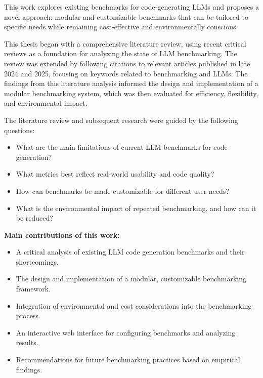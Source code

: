 This work explores existing benchmarks for code-generating LLMs and proposes a novel approach: modular and customizable benchmarks that can be tailored to specific needs while remaining cost-effective and environmentally conscious.

This thesis began with a comprehensive literature review, using recent critical reviews as a foundation for analyzing the state of LLM benchmarking. The review was extended by following citations to relevant articles published in late 2024 and 2025, focusing on keywords related to benchmarking and LLMs. The findings from this literature analysis informed the design and implementation of a modular benchmarking system, which was then evaluated for efficiency, flexibility, and environmental impact.

The literature review and subsequent research were guided by the following questions:
\begin{itemize}
    \item What are the main limitations of current LLM benchmarks for code generation?
    \item What metrics best reflect real-world usability and code quality?
    \item How can benchmarks be made customizable for different user needs?
    \item What is the environmental impact of repeated benchmarking, and how can it be reduced?
\end{itemize}

\textbf{Main contributions of this work:}
\begin{itemize}
    \item A critical analysis of existing LLM code generation benchmarks and their shortcomings.
    \item The design and implementation of a modular, customizable benchmarking framework.
    \item Integration of environmental and cost considerations into the benchmarking process.
    \item An interactive web interface for configuring benchmarks and analyzing results.
    \item Recommendations for future benchmarking practices based on empirical findings.
\end{itemize}

